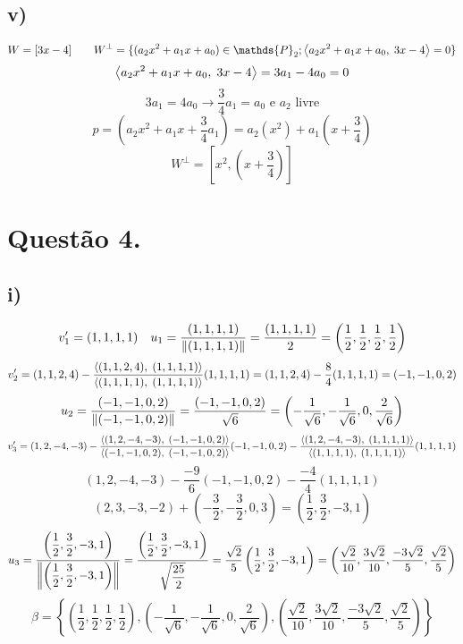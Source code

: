 \documentclass[12pt]{article}
\begin{document}
\subsection{v)}

\[W = [3x-4] \qquad W^{\perp} = \lbrace (a_{2}x^{2}+a_{1}x+a_0) \in \mathds{P}_{2} ; \p{a_{2}x^{2}+a_{1}x+a_0}{3x-4} = 0 \rbrace\]
\[\left\langle a_{2}x^{2}+a_{1}x+a_0,\;3x-4\right\rangle = 3a_{1}-4a_{0} = 0\]
\[3a_{1}=4a_{0} \longrightarrow \dfrac{3}{4}a_{1} = a_{0} \text{ e } a_{2} \text{ livre}\]
\[p = \left( a_{2}x^{2} + a_{1}x + \dfrac{3}{4}a_{1} \right) = a_{2}(x^{2}) + a_{1} \left( x + \dfrac{3}{4} \right)\]
\[W^{\perp} = \left[ x^{2}, \left( x + \dfrac{3}{4} \right) \right]\]

\section{Questão 4.}
\subsection{i)}

\[v_{1}' = (1,1,1,1) \quad  u_{1} = \dfrac{(1,1,1,1)}{\left\|\left(1,1,1,1\right)\right\|} = \dfrac{(1,1,1,1)}{2} = \left( \dfrac{1}{2}, \dfrac{1}{2},\dfrac{1}{2},\dfrac{1}{2} \right) \]
\[v_{2}' = (1,1,2,4) - \dfrac{\left\langle(1,1,2,4),\;(1,1,1,1)\right\rangle}{\left\langle(1,1,1,1),\;(1,1,1,1)\right\rangle}(1,1,1,1) = (1,1,2,4) - \dfrac{8}{4}(1,1,1,1) = (-1,-1,0,2)\]
\[u_{2} = \dfrac{(-1,-1,0,2)}{\left\|\left(-1,-1,0,2\right)\right\|} = \dfrac{(-1,-1,0,2)}{\sqrt{6}} = \left( -\dfrac{1}{\sqrt{6}}, -\dfrac{1}{\sqrt{6}}, 0, \dfrac{2}{\sqrt{6}} \right)\]
\[v_{3}' = (1,2,-4,-3) - \dfrac{\left\langle(1,2,-4,-3),\;(-1,-1,0,2)\right\rangle}{\left\langle(-1,-1,0,2),\;(-1,-1,0,2)\right\rangle}(-1,-1,0,2) - \dfrac{\left\langle(1,2,-4,-3),\;(1,1,1,1)\right\rangle}{\left\langle(1,1,1,1),\;(1,1,1,1)\right\rangle}(1,1,1,1)\]
\[(1,2,-4,-3) - \dfrac{-9}{6}(-1,-1,0,2) - \dfrac{-4}{4}(1,1,1,1)\]
\[(2,3,-3,-2) + \left(-\dfrac{3}{2}, -\dfrac{3}{2}, 0, 3\right) = \left( \dfrac{1}{2}, \dfrac{3}{2},-3,1 \right)\]
\[u_{3} = \dfrac{\left( \dfrac{1}{2}, \dfrac{3}{2},-3,1 \right)}{\left\|\left(\dfrac{1}{2}, \dfrac{3}{2},-3,1\right)\right\|} = \dfrac{\left( \dfrac{1}{2}, \dfrac{3}{2},-3,1 \right)}{\sqrt{\dfrac{25}{2}}} = \dfrac{\sqrt{2}}{5} \left( \dfrac{1}{2}, \dfrac{3}{2},-3,1 \right)  = \left( \dfrac{\sqrt{2}}{10}, \dfrac{3\sqrt{2}}{10}, \dfrac{-3\sqrt{2}}{5}, \dfrac{\sqrt{2}}{5} \right)\]
\[\beta = \left\lbrace \left( \dfrac{1}{2}, \dfrac{1}{2},\dfrac{1}{2},\dfrac{1}{2} \right), \left( -\dfrac{1}{\sqrt{6}}, -\dfrac{1}{\sqrt{6}}, 0, \dfrac{2}{\sqrt{6}} \right), \left( \dfrac{\sqrt{2}}{10}, \dfrac{3\sqrt{2}}{10}, \dfrac{-3\sqrt{2}}{5}, \dfrac{\sqrt{2}}{5} \right) \right\rbrace\]
\end{document}
